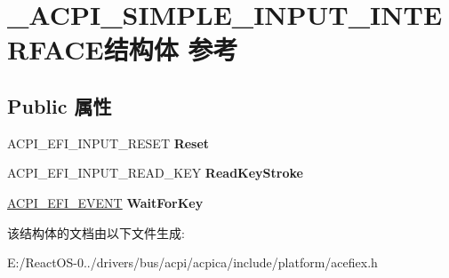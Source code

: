 \hypertarget{struct___a_c_p_i___s_i_m_p_l_e___i_n_p_u_t___i_n_t_e_r_f_a_c_e}{}\section{\+\_\+\+A\+C\+P\+I\+\_\+\+S\+I\+M\+P\+L\+E\+\_\+\+I\+N\+P\+U\+T\+\_\+\+I\+N\+T\+E\+R\+F\+A\+C\+E结构体 参考}
\label{struct___a_c_p_i___s_i_m_p_l_e___i_n_p_u_t___i_n_t_e_r_f_a_c_e}
\subsection*{Public 属性}
\begin{DoxyCompactItemize}
\item 
\mbox{\label{struct___a_c_p_i___s_i_m_p_l_e___i_n_p_u_t___i_n_t_e_r_f_a_c_e_af6bdd656833444e1fe39c858d880862d}} 
A\+C\+P\+I\+\_\+\+E\+F\+I\+\_\+\+I\+N\+P\+U\+T\+\_\+\+R\+E\+S\+ET {\bfseries Reset}
\item 
\mbox{\label{struct___a_c_p_i___s_i_m_p_l_e___i_n_p_u_t___i_n_t_e_r_f_a_c_e_acc32361240207b74bc3bc015b40a4197}} 
A\+C\+P\+I\+\_\+\+E\+F\+I\+\_\+\+I\+N\+P\+U\+T\+\_\+\+R\+E\+A\+D\+\_\+\+K\+EY {\bfseries Read\+Key\+Stroke}
\item 
\mbox{\label{struct___a_c_p_i___s_i_m_p_l_e___i_n_p_u_t___i_n_t_e_r_f_a_c_e_a02d2e97ca4eb6ba3b1b1f20eec7a644e}} 
\hyperlink{interfacevoid}{A\+C\+P\+I\+\_\+\+E\+F\+I\+\_\+\+E\+V\+E\+NT} {\bfseries Wait\+For\+Key}
\end{DoxyCompactItemize}


该结构体的文档由以下文件生成\+:\begin{DoxyCompactItemize}
\item 
E\+:/\+React\+O\+S-\/0../drivers/bus/acpi/acpica/include/platform/acefiex.\+h\end{DoxyCompactItemize}
